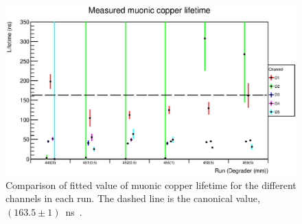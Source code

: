 \begin{figure}[hptb]
  \centering
    \includegraphics[width=.9\textwidth]{images/plot_generating_scripts/per_ch_copper_lifetime.eps}
  \caption{Comparison of fitted value of muonic copper lifetime for the different channels in each run. The dashed line is the canonical value, \((163.5\pm1)\)~ns~\cite{suzuki_mu_capture_rates}.}
  \label{fig:images_plot_generating_scripts_per_ch_copper_lifetime}
\end{figure}

